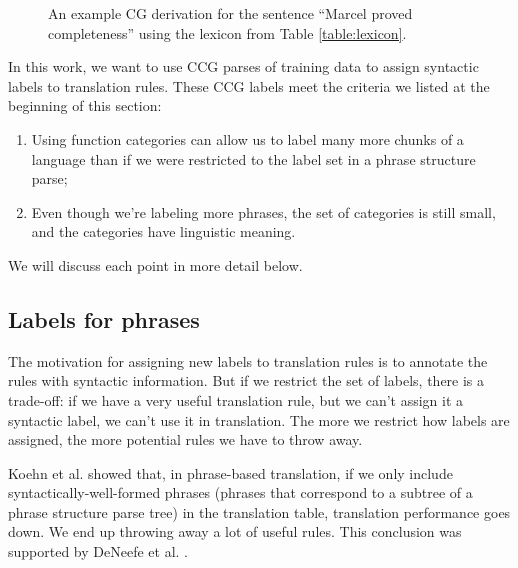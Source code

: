 \documentclass{article}
\begin{document}
\begin{figure}
\centering
{}
\caption{An example CG derivation for the sentence ``Marcel proved completeness'' using the lexicon from Table \ref{table:lexicon}.\label{fig:ccg-derivation}}
\end{figure}

In this work, we want to use CCG parses of training data to assign syntactic labels to translation rules. These CCG labels meet the criteria we listed at the beginning of this section:
\begin{enumerate}
\item Using function categories can allow us to label many more chunks of a language than if we were restricted to the label set in a phrase structure parse;
\item Even though we're labeling more phrases, the set of categories is still small, and the categories have linguistic meaning.
\end{enumerate}
We will discuss each point in more detail below.

\subsection{Labels for phrases}

The motivation for assigning new labels to translation rules is to annotate the rules with syntactic information. But if we restrict the set of labels, there is a trade-off: if we have a very useful translation rule, but we can't assign it a syntactic label, we can't use it in translation. The more we restrict how labels are assigned, the more potential rules we have to throw away.

Koehn et al.  showed that, in phrase-based translation, if we only include syntactically-well-formed phrases (phrases that correspond to a subtree of a phrase structure parse tree) in the translation table, translation performance goes down. We end up throwing away a lot of useful rules. This conclusion was supported by DeNeefe et al. .
\end{document}
